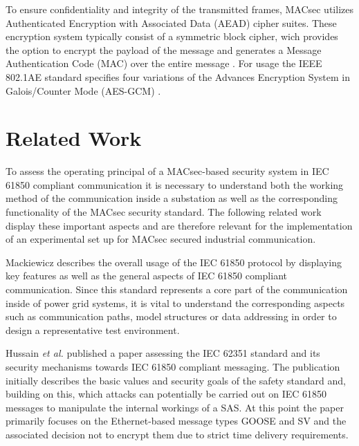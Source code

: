 \documentclass[conference, onecolumn, a4paper]{IEEEtran}
\begin{document}
\smallskip
To ensure confidentiality and integrity of the transmitted frames, MACsec utilizes Authenticated Encryption with Associated Data (AEAD) cipher suites. 
These encryption system typically consist of a symmetric block cipher, wich provides the option to encrypt the payload of the message and generates a 
Message Authentication Code (MAC) over the entire message \cite{GOOSE_confidentiality_integrity:2020}. For usage the IEEE 802.1AE standard specifies 
four variations of the Advances Encryption System in Galois/Counter Mode (AES-GCM) \cite[p. 143ff]{IEEE-802-1AE:2018}.

\section{Related Work}
\label{chapter:relatedWork}
\noindent To assess the operating principal of a MACsec-based security system in IEC 61850 compliant communication it is necessary to understand both 
the working method of the communication inside a substation as well as the corresponding functionality of the MACsec security standard. The following 
related work display these important aspects and are therefore relevant for the implementation of an experimental set up for MACsec secured industrial 
communication.

\smallskip
Mackiewicz \cite{IEC61850_Overview:2006} describes the overall usage of the IEC 61850 protocol by displaying key features as well as the general aspects 
of IEC 61850 compliant communication. Since this standard represents a core part of the communication inside of power grid systems, it is vital to 
understand the corresponding aspects such as communication paths, model structures or data addressing in order to design a representative test environment. 

\smallskip
Hussain  \textit{et al.} \cite{Review_IEC62351:2019} published a paper assessing the IEC 62351 standard and its security mechanisms towards IEC 61850 
compliant messaging. The publication initially describes the basic values and security goals of the safety standard and, building on this, which attacks 
can potentially be carried out on IEC 61850 messages to manipulate the internal workings of a SAS. At this point the paper primarily focuses on the 
Ethernet-based message types GOOSE and SV and the associated decision not to encrypt them due to strict time delivery requirements.  
\end{document}
